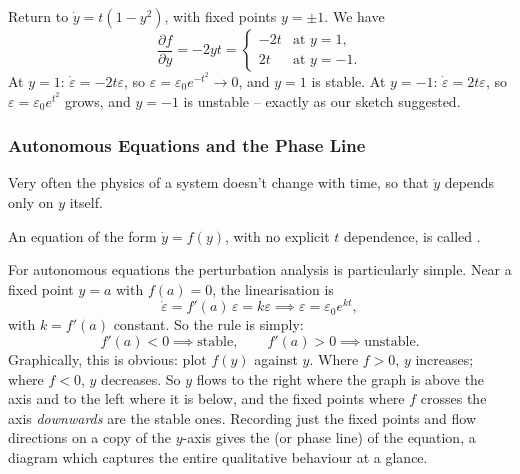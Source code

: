 \documentclass[a4paper]{scrartcl}
\begin{document}
\begin{example}
	Return to $\dot y = t(1 - y^2)$, with fixed points $y = \pm 1$. We have
	$$
	\frac{\partial f}{\partial y} = -2yt = \begin{cases} -2t & \text{at } y = 1, \\ 2t & \text{at } y = -1. \end{cases}
	$$
	At $y = 1$: $\dot\varepsilon = -2t \varepsilon$, so $\varepsilon = \varepsilon_0 e^{-t^2} \to 0$, and $y = 1$ is stable. At $y = -1$: $\dot\varepsilon = 2t\varepsilon$, so $\varepsilon = \varepsilon_0 e^{t^2}$ grows, and $y = -1$ is unstable -- exactly as our sketch suggested.
\end{example}

\subsubsection{Autonomous Equations and the Phase Line}

Very often the physics of a system doesn't change with time, so that $\dot y$ depends only on $y$ itself.

\begin{definition}
	An equation of the form $\dot{y} = f(y)$, with no explicit $t$ dependence, is called .
\end{definition}

For autonomous equations the perturbation analysis is particularly simple. Near a fixed point $y = a$ with $f(a) = 0$, the linearisation is
$$
\dot\varepsilon = f'(a) \, \varepsilon = k \varepsilon \implies \varepsilon = \varepsilon_0 e^{kt},
$$
with $k = f'(a)$ constant. So the rule is simply:
$$
f'(a) < 0 \implies \text{stable}, \qquad f'(a) > 0 \implies \text{unstable}.
$$
Graphically, this is obvious: plot $f(y)$ against $y$. Where $f > 0$, $y$ increases; where $f < 0$, $y$ decreases. So $y$ flows to the right where the graph is above the axis and to the left where it is below, and the fixed points where $f$ crosses the axis \emph{downwards} are the stable ones. Recording just the fixed points and flow directions on a copy of the $y$-axis gives the  (or phase line) of the equation, a diagram which captures the entire qualitative behaviour at a glance.
\end{document}
